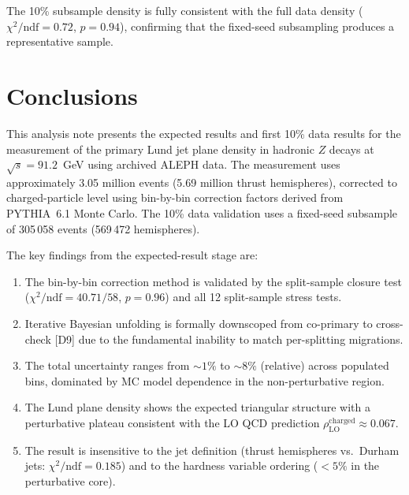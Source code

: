\documentclass[11pt,a4paper]{article}
\begin{document}
The 10\% subsample density is fully consistent with the full data
density ($\chi^2/\text{ndf} = 0.72$, $p = 0.94$), confirming that
the fixed-seed subsampling produces a representative sample.

\section{Conclusions}
\label{sec:conclusions}

This analysis note presents the expected results and first 10\% data
results for the measurement of the primary Lund jet plane density in
hadronic $Z$ decays at $\sqrt{s} = 91.2$~GeV using archived ALEPH
data.  The measurement uses approximately 3.05 million events (5.69
million thrust hemispheres), corrected to charged-particle level using
bin-by-bin correction factors derived from PYTHIA~6.1 Monte Carlo.
The 10\% data validation uses a fixed-seed subsample of 305\,058 events
(569\,472 hemispheres).

The key findings from the expected-result stage are:
\begin{enumerate}
\item The bin-by-bin correction method is validated by the
  split-sample closure test ($\chi^2/\text{ndf} = 40.71/58$,
  $p = 0.96$) and all 12 split-sample stress tests.
\item Iterative Bayesian unfolding is formally downscoped from
  co-primary to cross-check [D9] due to the fundamental inability
  to match per-splitting migrations.
\item The total uncertainty ranges from $\sim\!1\%$ to $\sim\!8\%$
  (relative) across populated bins, dominated by MC model dependence
  in the non-perturbative region.
\item The Lund plane density shows the expected triangular structure
  with a perturbative plateau consistent with the LO QCD prediction
  $\rho_\text{LO}^\text{charged} \approx 0.067$.
\item The result is insensitive to the jet definition (thrust
  hemispheres vs.\ Durham jets: $\chi^2/\text{ndf} = 0.185$) and
  to the hardness variable ordering ($<\!5\%$ in the perturbative core).
\end{enumerate}
\end{document}
